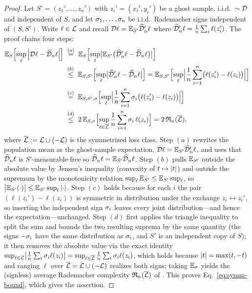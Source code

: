 \begin{proof}
Let $S'=(z_1',\dots,z_n')$ with $z_i'=(x_i',y_i')$ be a ghost sample, i.i.d.\
$\sim\mathcal{D}$ and independent of $S$, and let $\sigma_1,\dots,\sigma_n$ be i.i.d.\
Rademacher signs independent of $(S,S')$. Write $\ell\in\mathcal{L}$ and recall
$\mathcal{D}\ell=\mathbb{E}_{S'}\widehat{\mathcal{D}}_n'\ell$ where $\widehat{\mathcal{D}}_n'\ell
=\frac1n\sum_i\ell(z_i')$. The proof chains four steps:
\begin{align}
\mathbb{E}_{S}\Bigl[\sup_{\ell}\left| \mathcal{D}\ell-\widehat{\mathcal{D}}_n\ell \right|\Bigr]
&\;\overset{(a)}{=}\;
\mathbb{E}_{S}\Bigl[\sup_{\ell}\bigl|\mathbb{E}_{S'}\bigl(\widehat{\mathcal{D}}_n'\ell
   -\widehat{\mathcal{D}}_n\ell\bigr)\bigr|\Bigr]
\notag\\
&\;\overset{(b)}{\le}\;
\mathbb{E}_{S,S'}\Bigl[\sup_{\ell}\bigl|\widehat{\mathcal{D}}_n'\ell-\widehat{\mathcal{D}}_n\ell\bigr|\Bigr]
=\mathbb{E}_{S,S'}\Bigl[\sup_{\ell}\Bigl|\frac1n\sum_{i=1}^{n}
   \bigl(\ell(z_i')-\ell(z_i)\bigr)\Bigr|\Bigr]
\notag\\
&\;\overset{(c)}{=}\;
\mathbb{E}_{S,S',\sigma}\Bigl[\sup_{\ell}\Bigl|\frac1n\sum_{i=1}^{n}
   \sigma_i\bigl(\ell(z_i')-\ell(z_i)\bigr)\Bigr|\Bigr]
\notag\\
&\;\overset{(d)}{\le}\;
2\,\mathbb{E}_{S,\sigma}\Bigl[\sup_{\ell\in\overline{\mathcal{L}}}\frac1n\sum_{i=1}^{n}\sigma_i\,\ell(z_i)\Bigr]
=2\,\mathfrak{R}_n(\overline{\mathcal{L}}),
\label{eq:symm-chain}
\end{align}
where $\overline{\mathcal{L}}:=\mathcal{L}\cup(-\mathcal{L})$ is the symmetrized loss class. Step $(a)$
rewrites the population mean as the ghost-sample expectation,
$\mathcal{D}\ell=\mathbb{E}_{S'}\widehat{\mathcal{D}}_n'\ell$, and uses that $\widehat{\mathcal{D}}_n\ell$ is
$S'$-measurable-free so $\widehat{\mathcal{D}}_n\ell=\mathbb{E}_{S'}\widehat{\mathcal{D}}_n\ell$. Step
$(b)$ pulls $\mathbb{E}_{S'}$ outside the absolute value by Jensen's inequality
(convexity of $t\mapsto\left| t \right|$) and outside the supremum by the monotonicity
relation $\sup_\ell\mathbb{E}_{S'}\le\mathbb{E}_{S'}\sup_\ell$, so
$\bigl|\mathbb{E}_{S'}(\cdot)\bigr|\le\mathbb{E}_{S'}\sup_\ell\left| \cdot \right|$. Step $(c)$ holds
because for each $i$ the pair $(\ell(z_i')-\ell(z_i))$ is symmetric in
distribution under the exchange $z_i\leftrightarrow z_i'$, so inserting the
independent sign $\sigma_i$ leaves every joint distribution---and hence the
expectation---unchanged. Step $(d)$ first applies the triangle inequality to
split the sum and bounds the two resulting suprema by the same quantity (the
signs $-\sigma_i$ have the same distribution as $\sigma_i$, and $S'$ is an
independent copy of $S$); it then removes the absolute value via the exact
identity
$\sup_{\ell\in\mathcal{L}}\bigl|\tfrac1n\sum_i\sigma_i\ell(z_i)\bigr|
=\sup_{\ell\in\overline{\mathcal{L}}}\tfrac1n\sum_i\sigma_i\ell(z_i)$,
which holds because $\left| t \right|=\max(t,-t)$ and ranging $\ell$ over
$\overline{\mathcal{L}}=\mathcal{L}\cup(-\mathcal{L})$ realizes both signs; taking $\mathbb{E}_\sigma$ yields the
(signless) average Rademacher complexity $\mathfrak{R}_n(\overline{\mathcal{L}})$ of
\Cref{def:rademacher}. This proves Eq.~\eqref{eq:symm-bound}, which gives the
assertion.
\end{proof}
